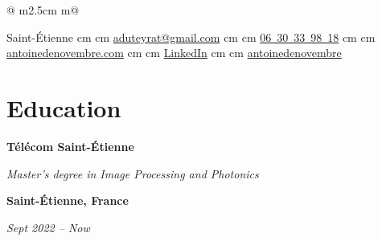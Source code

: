 \documentclass[10pt, letterpaper]{article}
\newenvironment{twocolentry}[2][]{
    \onecolentry
    \def\secondColumn{#2}
    \setcolumnwidth{\fill, 6 cm}
    \begin{paracol}{2}
}{
    \switchcolumn \raggedleft \secondColumn
    \end{paracol}
    \endonecolentry
} %
\newenvironment{header}{
    \setlength{\topsep}{0pt}\par\kern\topsep\centering\linespread{1.5}
}{
    \par\kern\topsep
} %
\let\hrefWithoutArrow\href
\renewcommand{\href}[2]{\hrefWithoutArrow{#1}{\ifthenelse{\equal{#2}{}}{ }{#2 }\raisebox{.15ex}{\footnotesize \faExternalLink*}}}
\begin{document}
\begin{header}
\begin{tabular}{@{} m{2.5cm}  m{\dimexpr\textwidth-2.5cm}@{} }
\begin{minipage}[t]{\linewidth}
            \normalsize
            \mbox{{\color{black}\footnotesize\faMapMarker*}\hspace*{0.13cm}Saint-Étienne}%
             cm%
            \AND%
             cm%
            \mbox{\hrefWithoutArrow{mailto:aduteyrat@gmail.com}{\color{black}{\footnotesize\faEnvelope[regular]}\hspace*{0.13cm}aduteyrat@gmail.com}}%
             cm%
            \AND%
             cm%
            \mbox{\hrefWithoutArrow{tel:+33-06-30-33-98-18}{\color{black}{\footnotesize\faPhone*}\hspace*{0.13cm}06 30 33 98 18}}%
             cm%
            \AND%
             cm%
            \mbox{\hrefWithoutArrow{https://antoinedenovembre.com/}{\color{black}{\footnotesize\faLink}\hspace*{0.13cm}antoinedenovembre.com}}%
             cm%
            \AND%
             cm%
            \mbox{\hrefWithoutArrow{https://linkedin.com/in/antoine-duteyrat/}{\color{black}{\footnotesize\faLinkedinIn}\hspace*{0.13cm}LinkedIn}}%
             cm%
            \AND%
             cm%
            \mbox{\hrefWithoutArrow{https://github.com/antoinedenovembre}{\color{black}{\footnotesize\faGithub}\hspace*{0.13cm}antoinedenovembre}}%
        \end{minipage}
    \end{tabular}
    \end{header}

    
    \vspace*{-0.4cm} 
    \section{Education}
        \begin{twocolentry}{
			\textbf{Saint-Étienne, France}

			\textit{Sept 2022 – Now}}
            \textbf{Télécom Saint-Étienne}

            \textit{Master’s degree in Image Processing and Photonics}
        \end{twocolentry}
\end{document}
